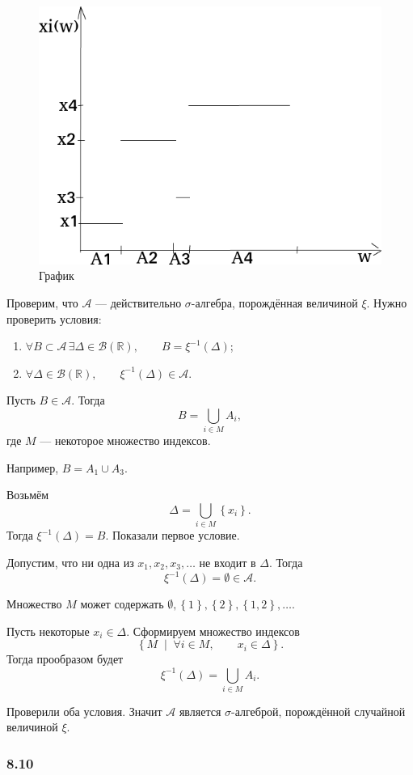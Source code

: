 \begin{figure}[h!]
  \centering
  \includegraphics[width=.4\textwidth]{./pictures/8_9.png}
  \caption{График}
  \label{fig:89}
\end{figure}

Проверим, что $ \mathcal{A} $ --- действительно $ \sigma $-алгебра, порождённая величиной $ \xi $.
Нужно проверить условия:
\begin{enumerate}
\item $ \forall B \subset \mathcal{A} \, \exists \Delta \in \mathcal{B} \left( \mathbb{R} \right), \qquad B = \xi^{-1} \left( \Delta \right) $;
\item $ \forall \Delta \in \mathcal{B} \left( \mathbb{R} \right), \qquad \xi^{-1} \left( \Delta \right) \in \mathcal{A} $.
\end{enumerate}
Пусть $B \in \mathcal{A} $.
Тогда
$$B =
\bigcup \limits_{i \in M} A_i,$$
где $M$ --- некоторое множество индексов.

Например, $B = A_1 \cup A_3$.

Возьмём
$$ \Delta =
\bigcup \limits_{i \in M} \left\{ x_i \right\}.$$
Тогда $ \xi^{-1} \left( \Delta \right) = B$.
Показали первое условие.

Допустим, что ни одна из $x_1, x_2, x_3, \dotsc $ не входит в $ \Delta $.
Тогда
$$ \xi^{-1} \left( \Delta \right) =
\emptyset \in
\mathcal{A}.$$

Множество $M$ может содержать $ \emptyset, \left\{ 1 \right\}, \left\{ 2 \right\}, \left\{ 1, 2 \right\}, \dotsc $.

Пусть некоторые $x_i \in \Delta $.
Сформируем множество индексов
$$ \left\{ M \; \middle| \; \forall i \in M, \qquad x_i \in \Delta \right\}.$$
Тогда прообразом будет
$$ \xi^{-1} \left( \Delta \right) =
\bigcup \limits_{i \in M} A_i.$$

Проверили оба условия.
Значит $ \mathcal{A} $ является $ \sigma $-алгеброй, порождённой случайной величиной $ \xi $.

\subsubsection*{8.10}

